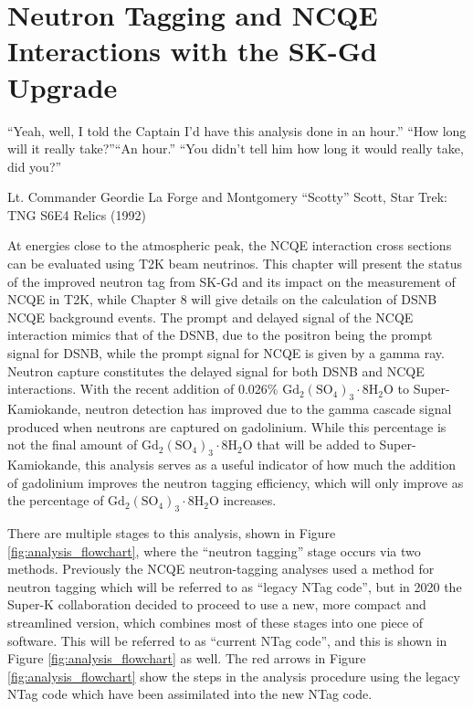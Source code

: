 \chapter{Neutron Tagging and NCQE
Interactions with the SK-Gd Upgrade}
\epigraph{``Yeah, well, I told the Captain I’d have this analysis done in an hour.'' \newline``How long will it really take?''\newline ``An hour.'' \newline``You didn’t tell him how long it would really take, did you?''}{Lt. Commander Geordie La Forge and Montgomery ``Scotty'' Scott, Star Trek: TNG S6E4 Relics (1992)}
\label{chp:ncqegd}


At energies close to the atmospheric peak, the NCQE interaction cross sections can be evaluated using T2K beam neutrinos. This chapter will present the status of the improved neutron tag from SK-Gd and its impact on the measurement of NCQE in T2K, while Chapter 8 will give details on the calculation of DSNB NCQE background events. The prompt and delayed signal of the NCQE interaction mimics that of the DSNB, due to the positron being the prompt signal for DSNB, while the prompt signal for NCQE is given by a gamma ray. Neutron capture constitutes the delayed signal for both DSNB and NCQE interactions. With the recent addition of 0.026\% $\mathrm{Gd}_{2}\left(\mathrm{SO}_{4}\right)_{3} \cdot 8 \mathrm{H}_{2} \mathrm{O}$ to Super-Kamiokande, neutron detection has improved due to the gamma cascade signal produced when neutrons are captured on gadolinium. While this percentage is not the final amount of $\mathrm{Gd}_{2}\left(\mathrm{SO}_{4}\right)_{3} \cdot 8 \mathrm{H}_{2} \mathrm{O}$ that will be added to Super-Kamiokande, this analysis serves as a useful indicator of how much the addition of gadolinium improves the neutron tagging efficiency, which will only improve as the percentage of $\mathrm{Gd}_{2}\left(\mathrm{SO}_{4}\right)_{3} \cdot 8 \mathrm{H}_{2} \mathrm{O}$ increases.

There are multiple stages to this analysis, shown in Figure \ref{fig:analysis_flowchart}, where the ``neutron tagging'' stage occurs via two methods. Previously the NCQE neutron-tagging analyses used a method for neutron tagging which will be referred to as ``legacy NTag code'', but in 2020 the Super-K collaboration decided to proceed to use a new, more compact and streamlined version, which combines most of these stages into one piece of software. This will be referred to as ``current NTag code'', and this is shown in Figure \ref{fig:analysis_flowchart} as well. The red arrows in Figure \ref{fig:analysis_flowchart} show the steps in the analysis procedure using the legacy NTag code which have been assimilated into the new NTag code.

